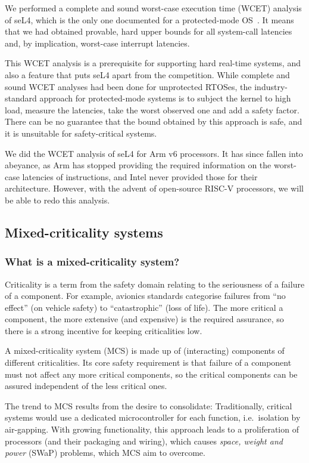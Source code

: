 \documentclass[english,a4paper,12pt]{report}
\newcommand{\SSect}[1]{\subsection{#1}}
\newcommand{\SSSect}[1]{\subsubsection*{#1}}
\newcommand{\SSect}[1]{\section{#1}}
\newcommand{\SSSect}[1]{\subsection*{#1}}
\begin{document}
  We performed a complete and sound worst-case execution time (WCET)
  analysis of seL4, which is the only one documented for a protected-mode
  OS~\citep{Blackham_SCRH_11, Sewell_KH_16}. It means that we had
  obtained provable, hard upper bounds for all system-call latencies
  and, by implication, worst-case interrupt latencies.

  This WCET analysis is a prerequisite for supporting hard real-time
  systems, and also a feature that puts seL4 apart from the
  competition. While complete and sound WCET analyses had been done
  for unprotected RTOSes, the industry-standard approach for
  protected-mode systems is to subject the kernel to high load,
  measure the latencies, take the worst observed one and add a safety
  factor. There can be no guarantee that the bound obtained by this
  approach is safe, and it is unsuitable for safety-critical systems.

  We did the WCET analysis of seL4 for Arm v6 processors. It has since
  fallen into abeyance, as Arm has stopped providing the required
  information on the worst-case latencies of instructions, and Intel
  never provided those for their architecture. However, with the
  advent of open-source RISC-V processors, we will be able to redo
  this analysis.

  \SSect{Mixed-criticality systems}\label{s:mcs}

  \SSSect{What is a mixed-criticality system?}

  Criticality is a term from the safety domain relating to the
  seriousness of a failure of a component. For example, avionics
  standards categorise failures from ``no effect'' (on vehicle safety)
  to ``catastrophic'' (loss of life). The more critical a component,
  the more extensive (and expensive) is the required assurance, so
  there is a strong incentive for keeping criticalities low.

  A mixed-criticality system (MCS) is made up of (interacting)
  components of different criticalities. Its core safety requirement
  is that failure of a component must not affect any more critical
  components, so the critical components can be assured independent of
  the less critical ones.

  The trend to MCS results from the desire to consolidate:
  Traditionally, critical systems would use a dedicated
  microcontroller for each function, i.e.\ isolation by air-gapping.
  With growing functionality, this approach leads to a proliferation
  of processors (and their packaging and wiring), which causes \emph{space,
  weight and power} (SWaP) problems, which MCS aim to overcome.
\end{document}
